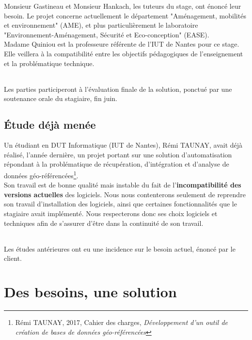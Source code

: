 \documentclass[french,12pt]{report}
\begin{document}
\begin{normalsize}
Monsieur Gastineau et Monsieur Hankach, les tuteurs du stage, ont énoncé leur besoin. Le projet concerne actuellement le département "Aménagement, mobilités et environnement" (AME), et plus particulièrement le laboratoire "Environnement-Aménagement, Sécurité et Eco-conception" (EASE).
\\ 

Madame Quiniou est la professeure référente de l’IUT de Nantes pour ce stage. Elle veillera à la compatibilité entre les objectifs pédagogiques de l’enseignement et la problématique technique.

\noindent \\Les parties participeront à l’évaluation finale de la solution, ponctué par une soutenance orale du stagiaire, fin juin.

   \section{Étude déjà menée}
   
\sloppy Un étudiant en DUT Informatique (IUT de Nantes), Rémi TAUNAY, avait déjà réalisé, l’année dernière, un projet portant sur une solution d’automatisation répondant à la problématique de récupération, d'intégration et d'analyse de données 
géo-référencées\footnote{Rémi TAUNAY, 2017, Cahier des charges, \textit{Développement d'un outil de création de bases de données géo-référencées}}.
\\

Son travail est de bonne qualité mais instable du fait de l’\textbf{incompatibilité des versions actuelles} des logiciels.
Nous nous contenterons seulement de reprendre son travail d’installation des logiciels, ainsi que certaines fonctionnalités que le stagiaire avait implémenté. Nous respecterons donc ses choix logiciels et techniques afin de s’assurer d’être dans la continuité de son travail. 

\noindent \\Les études antérieures ont eu une incidence sur le besoin actuel, énoncé par le client. 

   
   
   \chapter{Des besoins, une solution}
   

\end{normalsize}
\end{document}
